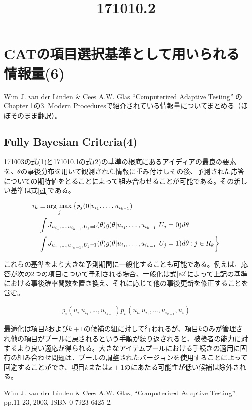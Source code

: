 \documentclass[a4j]{jarticle}
\date{}
\title{171010.2}
\begin{document}
\maketitle

\section{CATの項目選択基準として用いられる情報量(6)}
Wim J. van der Linden \& Cees A.W. Glas ``Computerized Adaptive Testing'' \cite{b1}のChapter 1の3. Modern Proceduresで紹介されている情報量についてまとめる（ほぼそのまま翻訳）。

\subsection{Fully Bayesian Criteria(4)}
171003の式(1)と171010.1の式(2)の基準の根底にあるアイディアの最良の要素を、$\theta$の事後分布を用いて観測された情報に重み付けしその後、予測された応答についての期待値をとることによって組み合わせることが可能である。その新しい基準は式\ref{e1}である。

\newcommand{\argmax}{\mathop{\rm arg~max}\limits}
\begin{eqnarray}
\begin{split}
  \label{e1}
  i_{k} &\equiv \argmax_{j}\left\{p_{j}(0|u_{i_{1}},\ldots,u_{i_{k-1}})\right.\\
  &\left.\int J_{u_{i_{1}},\ldots,u_{i_{k-1}},U_{j}=0}(\theta)g(\theta|u_{i_{1}},\ldots,u_{i_{k-1}},U_{j}=0)d\theta\right.\\
  &\left.\int J_{u_{i_{1}},\ldots,u_{i_{k-1}},U_{j}=1}(\theta)g(\theta|u_{i_{1}},\ldots,u_{i_{k-1}},U_{j}=1)d\theta:j\in R_{k}\right\}
\end{split}
\end{eqnarray}

これらの基準をより大きな予測期間に一般化することも可能である。例えば、応答が次の2つの項目について予測される場合、一般化は式\ref{e2}によって上記の基準における事後確率関数を置き換え、それに応じて他の事後更新を修正することを含む。

\begin{eqnarray}
  \label{e2}
  p_{i}(u_{i}|u_{i_{1}},\ldots,u_{i_{k-1}})p_{h}(u_{h}|u_{i_{1}},\ldots,u_{i_{k-1}},u_{i})
\end{eqnarray}

最適化は項目$k$および$k+1$の候補の組に対して行われるが、項目$k$のみが管理され他の項目がプールに戻されるという手順が繰り返されると、被検者の能力に対するより良い適応が得られる。大きなアイテムプールにおける手続きの適用に固有の組み合わせ問題は、プールの調整されたバージョンを使用することによって回避することができ、項目$k$または$k+1$のにあたる可能性が低い候補は除外される。

\begin{thebibliography}{9}
   Wim J. van der Linden \& Cees A.W. Glas, ``Computerized Adaptive Testing'', pp.11-23, 2003, ISBN 0-7923-6425-2.
\end{thebibliography}
\end{document}
